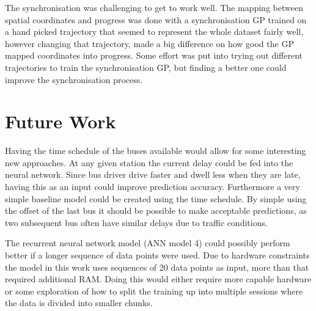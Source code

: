 The synchronisation was challenging to get to work well. The mapping between spatial coordinates and progress was done with a synchronisation GP trained on a hand picked trajectory that seemed to represent the whole dataset fairly well, however changing that trajectory, made a big difference on how good the GP mapped coordinates into progress. Some effort was put into trying out different trajectories to train the synchronisation GP, but finding a better one could improve the synchronisation process.

\section{Future Work}
\label{sec:future-work}
Having the time schedule of the buses available would allow for some interesting new approaches. At any given station the current delay could be fed into the neural network. Since bus driver drive faster and dwell less when they are late, having this as an input could improve prediction accuracy. Furthermore a very simple baseline model could be created using the time schedule. By simple using the offset of the last bus it should be possible to make acceptable predictions, as two subsequent bus often have similar delays due to traffic conditions.

The recurrent neural network model (ANN model 4) could possibly perform better if a longer sequence of data points were used. Due to hardware constraints the model in this work uses sequences of 20 data points as input, more than that required additional RAM. Doing this would either require more capable hardware or some exploration of how to split the training up into multiple sessions where the data is divided into smaller chunks.


